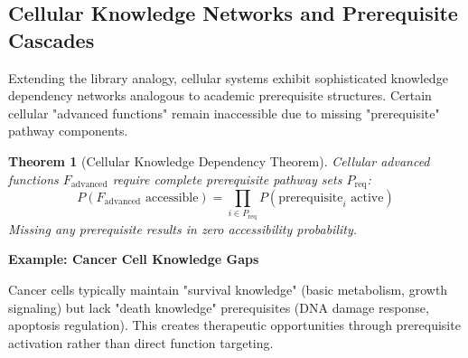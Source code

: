 \documentclass[12pt,a4paper]{article}
\newtheorem{theorem}{Theorem}[section]
\begin{document}
\subsection{Cellular Knowledge Networks and Prerequisite Cascades}

Extending the library analogy, cellular systems exhibit sophisticated knowledge dependency networks analogous to academic prerequisite structures. Certain cellular "advanced functions" remain inaccessible due to missing "prerequisite" pathway components.

\begin{theorem}[Cellular Knowledge Dependency Theorem]
Cellular advanced functions $F_{\text{advanced}}$ require complete prerequisite pathway sets $P_{\text{req}}$:
$$P(F_{\text{advanced}} \text{ accessible}) = \prod_{i \in P_{\text{req}}} P(\text{prerequisite}_i \text{ active})$$
Missing any prerequisite results in zero accessibility probability.
\end{theorem}

\textbf{Example: Cancer Cell Knowledge Gaps}

Cancer cells typically maintain "survival knowledge" (basic metabolism, growth signaling) but lack "death knowledge" prerequisites (DNA damage response, apoptosis regulation). This creates therapeutic opportunities through prerequisite activation rather than direct function targeting.
\end{document}
